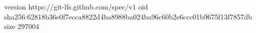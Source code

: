 version https://git-lfs.github.com/spec/v1
oid sha256:62818b36e0f7ecca8822d4ba8988ba024ba96c60b2e6ccc01b9675f13f7857db
size 297004
